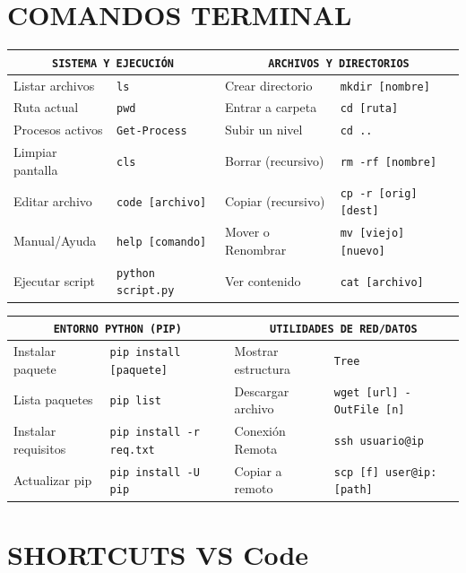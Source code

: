 \section{COMANDOS TERMINAL }
\newcommand{\kbraw}[4]{#1 & \texttt{#2} & #3 & \texttt{#4} \\}


\noindent
\begin{tabularx}{\linewidth}{@{} X l | X l @{}}
\multicolumn{2}{c}{\texttt{SISTEMA Y EJECUCIÓN}} & \multicolumn{2}{c}{\texttt{ARCHIVOS Y DIRECTORIOS}} \\
\midrule
\kbraw{Listar archivos}{ls}{Crear directorio}{mkdir [nombre]}
\kbraw{Ruta actual}{pwd}{Entrar a carpeta}{cd [ruta]}
\kbraw{Procesos activos}{Get-Process}{Subir un nivel}{cd ..}
\kbraw{Limpiar pantalla}{cls}{Borrar (recursivo)}{rm -rf [nombre]}
\kbraw{Editar archivo}{code [archivo]}{Copiar (recursivo)}{cp -r [orig] [dest]}
\kbraw{Manual/Ayuda}{help [comando]}{Mover o Renombrar}{mv [viejo] [nuevo]}
\kbraw{Ejecutar script}{python script.py}{Ver contenido}{cat [archivo]}
\midrule
\end{tabularx}
\noindent
\begin{tabularx}{\linewidth}{@{} X l | X l @{}}
\multicolumn{2}{c}{\texttt{ENTORNO PYTHON (PIP)}} & \multicolumn{2}{c}{\texttt{UTILIDADES DE RED/DATOS}} \\
\midrule
\kbraw{Instalar paquete}{pip install [paquete]}{Mostrar estructura}{Tree}
\kbraw{Lista paquetes}{pip list}{Descargar archivo}{wget [url] -OutFile [n]}
\kbraw{Instalar requisitos}{pip install -r req.txt}{Conexión Remota}{ssh usuario@ip}
\kbraw{Actualizar pip}{pip install -U pip}{Copiar a remoto}{scp [f] user@ip:[path]}
\bottomrule
\end{tabularx}



\section{SHORTCUTS VS Code } 
\newcommand{\kbrow}[4]{#1 & \texttt{#2} & #3 & \texttt{#4} \\}

